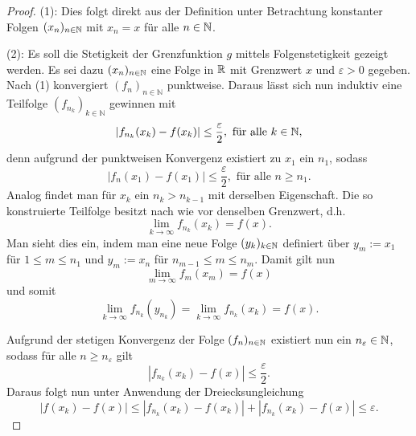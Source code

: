 \begin{proof}
  (1): 
  Dies folgt direkt aus der Definition unter Betrachtung konstanter Folgen $(x_n)_{n \in \mathbb{N}}$ mit $x_n = x$ für alle $n \in \mathbb{N}$.

  (2): 
  Es soll die Stetigkeit der Grenzfunktion $g$ mittels Folgenstetigkeit gezeigt werden. 
  Es sei dazu $(x_n)_{n \in \mathbb{N}}$ eine Folge in $\mathbb{R}$ mit Grenzwert $x$ und $\varepsilon > 0$ gegeben.
  Nach (1) konvergiert $(f_n)_{n \in \mathbb{N}}$ punktweise.
  Daraus lässt sich nun induktiv eine Teilfolge $(f_{n_k})_{k \in \mathbb{N}}$ gewinnen mit
  \begin{displaymath}
    | f_{n_k}(x_k) - f(x_k) | \leq \frac{\varepsilon}{2}, \text{ für alle $k \in \mathbb{N}$},
  \end{displaymath}
  denn aufgrund der punktweisen Konvergenz existiert zu $x_1$ ein $n_1$, sodass
  \begin{displaymath}
    | f_{n}(x_1) - f(x_1) | \leq \frac{\varepsilon}{2}, \text{ für alle $n \geq n_1$}.
  \end{displaymath}
  Analog findet man für $x_k$ ein $n_k > n_{k-1}$ mit derselben Eigenschaft.
  Die so konstruierte Teilfolge besitzt nach wie vor denselben Grenzwert, d.h.
  \begin{displaymath}
    \lim_{k \to \infty} f_{n_k}(x_k) = f(x).
  \end{displaymath}
  Man sieht dies ein, indem man eine neue Folge $(y_k)_{k \in \mathbb{N}}$ definiert über $y_m:=x_1$ für $1 \leq m \leq n_1$ und $y_m:=x_n$ für $n_{m-1} \leq m \leq n_{m}$.
  Damit gilt nun
  \begin{displaymath}
    \lim_{m \to \infty} f_m(x_m) = f(x)
  \end{displaymath}
  und somit
  \begin{displaymath}
    \lim_{k \to \infty} f_{n_k}(y_{n_k}) 
    = \lim_{k \to \infty} f_{n_k}(x_{k}) = f(x).
  \end{displaymath}
  
  Aufgrund der stetigen Konvergenz der Folge $(f_n)_{n \in \mathbb{N}}$ existiert nun ein $n_\varepsilon \in \mathbb{N}$, sodass für alle $n \geq n_\varepsilon$ gilt
  \begin{displaymath}
    | f_{n_k}(x_k) - f(x) | \leq \frac{\varepsilon}{2}.
  \end{displaymath}
  Daraus folgt nun unter Anwendung der Dreiecksungleichung
  \begin{displaymath}
    | f(x_k) - f(x) |
    \leq
    | f_{n_k}(x_k) - f(x_k) | + | f_{n_k}(x_k) - f(x) | 
    \leq \varepsilon.
  \end{displaymath}


\end{proof}

